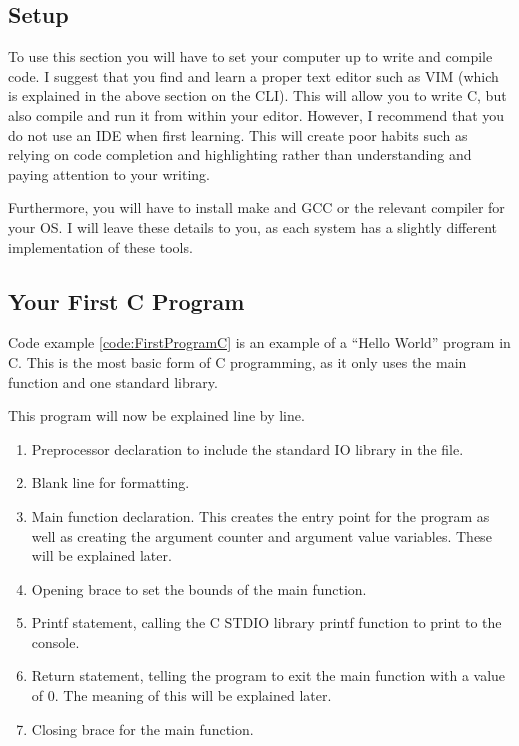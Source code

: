 \documentclass[a4paper,11pt]{report}
\begin{document}
		\subsection{Setup}
			To use this section you will have to set your computer up to write and compile code. 
			I suggest that you find and learn a proper text editor such as VIM (which is explained in the above section on the CLI).
			This will allow you to write C, but also compile and run it from within your editor. 
			However, I recommend that you do not use an IDE when first learning. 
			This will create poor habits such as relying on code completion and highlighting rather than understanding and paying attention to your writing. 

			Furthermore, you will have to install make and GCC or the relevant compiler for your OS. 
			I will leave these details to you, as each system has a slightly different implementation of these tools. 

		\subsection{Your First C Program}
			Code example \ref{code:FirstProgramC} is an example of a ``Hello World'' program in C. 
			This is the most basic form of C programming, as it only uses the main function and one standard library. 
			\begin{code}
				C}]{./first.c}
				\caption{A Simple Hello World Program in C}
				\label{code:FirstProgramC}
			\end{code}
			This program will now be explained line by line. 
			\begin{enumerate}
				\item Preprocessor declaration to include the standard IO library in the file. 
				\item Blank line for formatting. 
				\item Main function declaration. 
					This creates the entry point for the program as well as creating the argument counter and argument value variables. 
					These will be explained later. 
				\item Opening brace to set the bounds of the main function. 
				\item Printf statement, calling the C STDIO library printf function to print to the console. 
				\item Return statement, telling the program to exit the main function with a value of 0. 
					The meaning of this will be explained later. 
				\item Closing brace for the main function. 
			\end{enumerate}
\end{document}
